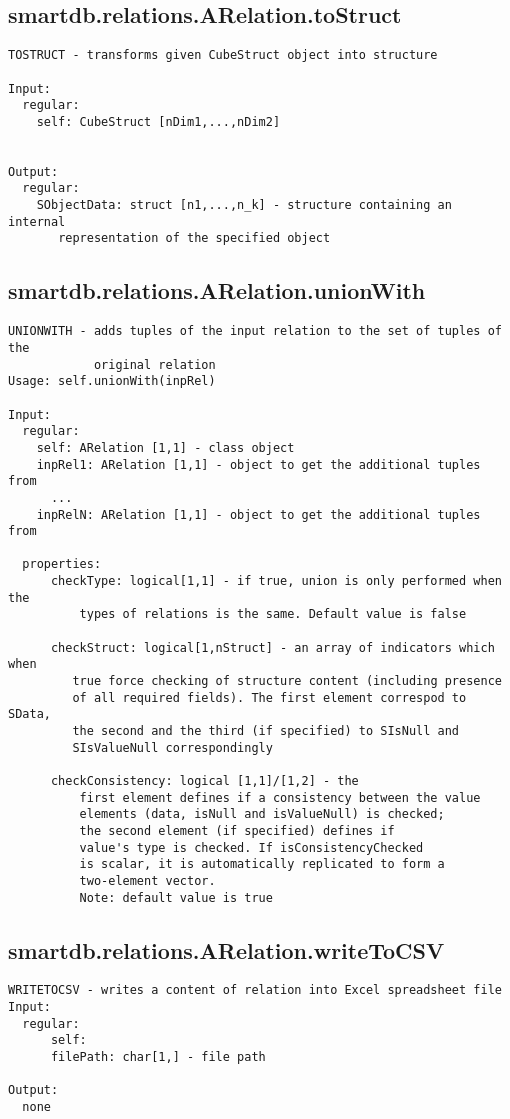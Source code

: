 \subsection{\texorpdfstring{smartdb.relations.ARelation.toStruct}{toStruct}}\label{method:smartdb.relations.ARelation.toStruct}
\begin{verbatim}
TOSTRUCT - transforms given CubeStruct object into structure

Input:
  regular:
    self: CubeStruct [nDim1,...,nDim2]


Output:
  regular:
    SObjectData: struct [n1,...,n_k] - structure containing an internal
       representation of the specified object
\end{verbatim}
\subsection{\texorpdfstring{smartdb.relations.ARelation.unionWith}{unionWith}}\label{method:smartdb.relations.ARelation.unionWith}
\begin{verbatim}
UNIONWITH - adds tuples of the input relation to the set of tuples of the
            original relation
Usage: self.unionWith(inpRel)

Input:
  regular:
    self: ARelation [1,1] - class object
    inpRel1: ARelation [1,1] - object to get the additional tuples from
      ...
    inpRelN: ARelation [1,1] - object to get the additional tuples from

  properties:
      checkType: logical[1,1] - if true, union is only performed when the
          types of relations is the same. Default value is false

      checkStruct: logical[1,nStruct] - an array of indicators which when
         true force checking of structure content (including presence
         of all required fields). The first element correspod to SData,
         the second and the third (if specified) to SIsNull and
         SIsValueNull correspondingly

      checkConsistency: logical [1,1]/[1,2] - the
          first element defines if a consistency between the value
          elements (data, isNull and isValueNull) is checked;
          the second element (if specified) defines if
          value's type is checked. If isConsistencyChecked
          is scalar, it is automatically replicated to form a
          two-element vector.
          Note: default value is true
\end{verbatim}
\subsection{\texorpdfstring{smartdb.relations.ARelation.writeToCSV}{writeToCSV}}\label{method:smartdb.relations.ARelation.writeToCSV}
\begin{verbatim}
WRITETOCSV - writes a content of relation into Excel spreadsheet file
Input:
  regular:
      self:
      filePath: char[1,] - file path

Output:
  none
\end{verbatim}

